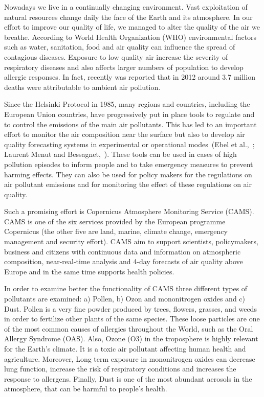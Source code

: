 \documentclass[9pt]{report}
\begin{document}
\noindent{}Nowadays we live in a continually changing environment. Vast exploitation of natural resources change daily the face of the Earth and its atmosphere. In our effort to improve our quality of life, we managed to alter the quality of the air we breathe. According to World Health Organization (WHO) environmental factors such as water, sanitation, food and air quality can inﬂuence the spread of contagious diseases. Exposure to low quality air increase the severity of respiratory diseases and also affects larger numbers of population to develop allergic responses. In fact, recently was reported that in 2012 around 3.7 million deaths were attributable to ambient air pollution. %

Since the Helsinki Protocol in 1985, many regions and countries, including the European Union countries, have progressively put in place tools to regulate and to control the emissions of the main air pollutants.
This has led to an important effort to monitor the air composition near the surface but also to develop air quality forecasting systems in experimental or operational modes~(Ebel et al.,~; Laurent Menut and Bessagnet,~).
These tools can be used in cases of high pollution episodes to inform people and to take emergency measures to prevent harming effects.
They can also be used for policy makers for the regulations on air pollutant emissions and for monitoring the effect of these regulations on air quality.%

Such a promising effort is Copernicus Atmosphere Monitoring Service (CAMS). CAMS is one of the six services provided by the European programme Copernicus (the other five are land, marine, climate change, emergency management and security effort). CAMS aim to support scientists, policymakers, business and citizens with continuous data and information on atmospheric composition, near-real-time analysis and 4-day forecasts of air quality above Europe and in the same time supports health policies.%

In order to examine better the functionality of CAMS three different types of pollutants are examined: a) Pollen, b) Ozon and mononitrogen oxides and c) Dust. Pollen is a very fine powder produced by trees, flowers, grasses, and weeds in order to fertilize other plants of the same species. These loose particles are one of the most common causes of allergies throughout the World, such as the Oral Allergy Syndrome (OAS). Also, Ozone (O3) in the troposphere is highly relevant for the Earth’s climate. It is a toxic air pollutant affecting human health and agriculture. Moreover, Long term exposure in mononitrogen oxides can decrease lung function, increase the risk of respiratory conditions and increases the response to allergens. Finally, Dust is one of the most abundant aerosols in the atmosphere, that can be harmful to people's health.%
\end{document}
